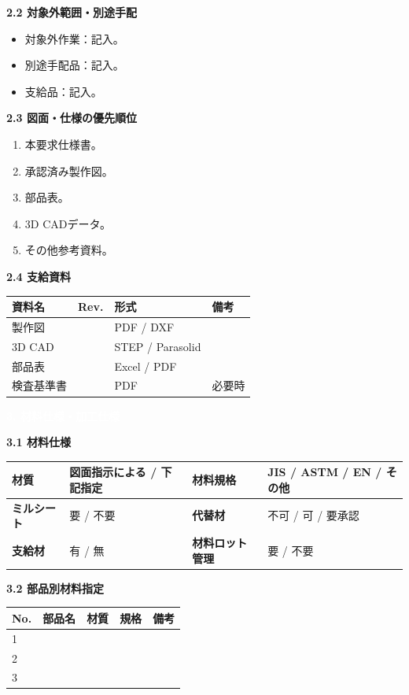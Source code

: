 \documentclass[a4paper,10pt]{ltjsarticle}
\makeatletter
\newlength{\SpecBodyWidth}
\newcommand{\PageTitle}[1]{%
  \vspace*{2mm}%
  \noindent\colorbox{SpecHead}{%
    \parbox{\dimexpr\SpecBodyWidth-2\fboxsep\relax}{%
      \large\bfseries\textcolor{white}{#1}%
    }%
  }%
  \par\vspace{5mm}%
}
\newcommand{\BlockTitle}[1]{%
  \vspace{4mm}%
  \noindent\colorbox{SpecSoft}{%
    \parbox{\dimexpr\SpecBodyWidth-2\fboxsep\relax}{%
      \normalsize\bfseries\textcolor{SpecHead}{#1}%
    }%
  }%
  \par\vspace{1.5mm}%
}
\newcommand{\Note}[1]{%
  \vspace{1.5mm}%
  \noindent\fbox{%
    \parbox{\dimexpr\SpecBodyWidth-2\fboxsep-2\fboxrule\relax}{%
      \footnotesize\textcolor{SpecMuted}{#1}%
    }%
  }%
  \par\vspace{1.5mm}%
}
\newenvironment{SpecTable}[1]{%
  \par\vspace{1mm}%
  \noindent\footnotesize%
  \renewcommand{\arraystretch}{1.10}%
  \setlength{\tabcolsep}{3.0pt}%
  \begin{tabular*}{\SpecBodyWidth}{@{\extracolsep{\fill}}#1@{}}%
}{%
  \end{tabular*}%
  \par\vspace{1.5mm}%
}
\newcommand{\Head}[1]{\textbf{\textcolor{SpecHead}{#1}}}
\newcommand{\Lab}[1]{\textbf{\textcolor{SpecHead}{#1}}}
\newcommand{\YN}{要 / 不要}
\makeatother
\begin{document}
\BlockTitle{2.2 対象外範囲・別途手配}
\begin{itemize}
  \item 対象外作業：記入。
  \item 別途手配品：記入。
  \item 支給品：記入。
\end{itemize}

\BlockTitle{2.3 図面・仕様の優先順位}
\begin{enumerate}
  \item 本要求仕様書。
  \item 承認済み製作図。
  \item 部品表。
  \item 3D CADデータ。
  \item その他参考資料。
\end{enumerate}
\Note{不一致、疑義、製作上の制約を発見した場合は、製作前に発注者へ確認すること。}

\BlockTitle{2.4 支給資料}
\begin{SpecTable}{|p{46mm}|p{18mm}|p{34mm}|p{48mm}|}
\hline
\Head{資料名} & \Head{Rev.} & \Head{形式} & \Head{備考} \\
\hline
製作図 &  & PDF / DXF &  \\
\hline
3D CAD &  & STEP / Parasolid &  \\
\hline
部品表 &  & Excel / PDF &  \\
\hline
検査基準書 &  & PDF & 必要時 \\
\hline
\end{SpecTable}

\clearpage

\PageTitle{3. 材料仕様・加工仕様}

\BlockTitle{3.1 材料仕様}
\begin{SpecTable}{|p{28mm}|p{43mm}|p{30mm}|p{43mm}|}
\hline
\Lab{材質} & 図面指示による / 下記指定 & \Lab{材料規格} & JIS / ASTM / EN / その他 \\
\hline
\Lab{ミルシート} & \YN & \Lab{代替材} & 不可 / 可 / 要承認 \\
\hline
\Lab{支給材} & 有 / 無 & \Lab{材料ロット管理} & \YN \\
\hline
\end{SpecTable}
\Note{代替材を提案する場合は、機械的性質、耐食性、熱処理性、溶接性、寸法安定性への影響を明記し、発注者の承認を得ること。}

\BlockTitle{3.2 部品別材料指定}
\begin{SpecTable}{|p{9mm}|p{48mm}|p{30mm}|p{30mm}|p{29mm}|}
\hline
\Head{No.} & \Head{部品名} & \Head{材質} & \Head{規格} & \Head{備考} \\
\hline
1 &  &  &  &  \\
\hline
2 &  &  &  &  \\
\hline
3 &  &  &  &  \\
\hline
\end{SpecTable}
\end{document}
